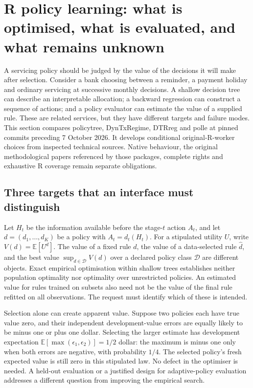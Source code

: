 \section{R policy learning: what is optimised, what is evaluated, and what remains unknown}
\label{sec:exec24-policies-r}

A servicing policy should be judged by the value of the decisions it will make after selection.
Consider a bank choosing between a reminder, a payment holiday and ordinary servicing at
successive monthly decisions. A shallow decision tree can describe an interpretable allocation;
a backward regression can construct a sequence of actions; and a policy evaluator can estimate
the value of a supplied rule. These are related services, but they have different targets and
failure modes. This section compares policytree, DynTxRegime, DTRreg and polle at pinned
commits preceding 7 October 2026. It develops conditional original-R-worker choices from
inspected technical sources. Native behaviour, the original methodological papers referenced
by those packages, complete rights and exhaustive R coverage remain separate obligations.

\subsection{Three targets that an interface must distinguish}
Let $H_t$ be the information available before the stage-$t$ action $A_t$, and let
$d=(d_1,\ldots,d_K)$ be a policy with $A_t=d_t(H_t)$. For a stipulated utility $U$,
write $V(d)=\mathbb E[U^d]$. The value of a fixed rule $d$, the value of a
data-selected rule $\widehat d$, and the best value
$\sup_{d\in\mathcal D}V(d)$ over a declared policy class $\mathcal D$ are different
objects. Exact empirical optimisation within shallow trees establishes neither
population optimality nor optimality over unrestricted policies. An estimated value
for rules trained on subsets also need not be the value of the final rule refitted
on all observations. The request must identify which of these is intended.

Selection alone can create apparent value. Suppose two policies each have true value
zero, and their independent development-value errors are equally likely to be minus
one or plus one dollar. Selecting the larger estimate has development expectation
$\mathbb E[\max(\epsilon_1,\epsilon_2)]=1/2$ dollar: the maximum is minus one
only when both errors are negative, with probability $1/4$. The selected policy's
fresh expected value is still zero in this stipulated law. No defect in the optimiser
is needed. A held-out evaluation or a justified design for adaptive-policy evaluation
addresses a different question from improving the empirical search.
\citep{exec24_policiesr_reference}

